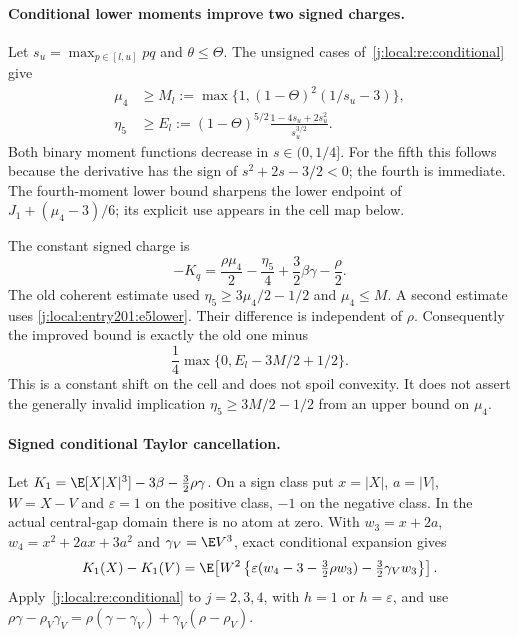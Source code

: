 \paragraph{Conditional lower moments improve two signed charges.}

Let $s_u=\max_{p\in[l,u]}pq$ and $\theta\le\Theta$.
The unsigned cases of~\eqref{j:local:re:conditional} give
\begin{align}
 \mu_4&\ge M_l:=\max\{1,(1-\Theta)^2(1/s_u-3)\},\label{j:local:entry201:m4lower}\\
 \eta_5&\ge E_l:=
 (1-\Theta)^{5/2}\frac{1-4s_u+2s_u^2}{s_u^{3/2}}.\label{j:local:entry201:e5lower}
\end{align}
Both binary moment functions decrease in $s\in(0,1/4]$.
For the fifth this follows because the derivative has the sign of
$s^2+2s-3/2<0$; the fourth is immediate.
The fourth-moment lower bound sharpens the lower endpoint of
$J_1+(\mu_4-3)/6$; its explicit use appears in the cell map below.

The constant signed charge is
\[
 -K_q=\frac{\rho\mu_4}{2}-\frac{\eta_5}{4}
       +\frac32\beta\gamma-\frac{\rho}{2}.
\]
The old coherent estimate used $\eta_5\ge3\mu_4/2-1/2$ and
$\mu_4\le M$. A second estimate uses \eqref{j:local:entry201:e5lower}.
Their difference is independent of $\rho$. Consequently the improved
bound is exactly the old one minus
\begin{equation}\label{j:local:entry201:eta-improvement}
 \frac14\max\{0,E_l-3M/2+1/2\}.
\end{equation}
This is a constant shift on the cell and does not spoil convexity.
It does not assert the generally invalid implication
$\eta_5\ge3M/2-1/2$ from an upper bound on $\mu_4$.

\paragraph{Signed conditional Taylor cancellation.}

Let $K_1=\E[X|X|^3]-3\beta-\tfrac32\rho\gamma$.
On a sign class put $x=|X|$, $a=|V|$, $W=X-V$ and
$\varepsilon=1$ on the positive class, $-1$ on the negative class.
In the actual central-gap domain there is no atom at zero.
With $w_3=x+2a$, $w_4=x^2+2ax+3a^2$ and
$\gamma_V=\E V^3$, exact conditional expansion gives
\begin{equation}\label{j:local:entry201:Kexact}
 K_1(X)-K_1(V)
 =\E\!\left[W^2
 \left\{\varepsilon(w_4-3-\tfrac32\rho w_3)
                   -\tfrac32\gamma_Vw_3\right\}\right].
\end{equation}
Apply~\eqref{j:local:re:conditional} to $j=2,3,4$, with $h=1$
or $h=\varepsilon$, and use
$\rho\gamma-\rho_V\gamma_V
=\rho(\gamma-\gamma_V)+\gamma_V(\rho-\rho_V)$.


